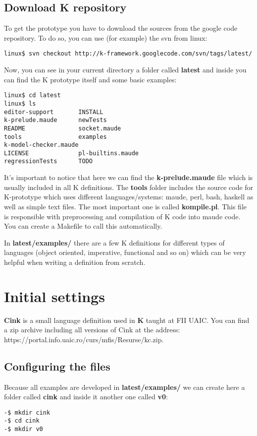 \documentclass[11pt,a4paper]{article}
\begin{document}
\subsection{Download K repository}

To get the prototype you have to download the sources from the google code repository. To do so, you can use (for example) the svn from linux:
\begin{verbatim}
linux$ svn checkout http://k-framework.googlecode.com/svn/tags/latest/
\end{verbatim}

Now, you can see in your current directory a folder called {\bf latest} and inside you can find the K
prototype itself and some basic examples:

\begin{verbatim}
linux$ cd latest
linux$ ls
editor-support       INSTALL
k-prelude.maude      newTests
README               socket.maude
tools                examples
k-model-checker.maude
LICENSE              pl-builtins.maude
regressionTests      TODO
\end{verbatim}

It's important to notice that here we can find the {\bf k-prelude.maude} file which is usually included in all K definitions. The {\bf tools} folder includes the source code for K-prototype which uses different languages/systems: maude, perl, bash, haskell as well as simple text files. The most important one is called {\bf kompile.pl}. This file is responsible with preprocessing and compilation of K code into maude code. You can create a Makefile to call this automatically.

In {\bf latest/examples/} there are a few K definitions for different types of languages (object oriented, imperative, functional and so on) which can be very helpful when writing a definition from scratch.
\section{Initial settings \label{init}}

{\bf Cink} is a small language definition used in {\bf K} taught at FII UAIC. You can find a zip archive including all versions of Cink at the address: 
\\{\color{red} https://portal.info.uaic.ro/curs/mfis/Resurse/kc.zip}. 

\subsection{Configuring the files}
Because all examples are developed in {\bf latest/examples/} we can create here a folder called {\bf cink} and inside it another one called {\bf v0}:
\begin{verbatim}
-$ mkdir cink
-$ cd cink
-$ mkdir v0
\end{verbatim}
\end{document}
